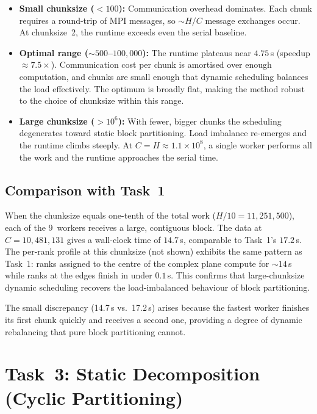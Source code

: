 \documentclass[11pt,a4paper]{article}
\begin{document}
\begin{itemize}\itemsep2pt
\item \textbf{Small chunksize ($< 100$):} Communication overhead
    dominates. Each chunk requires a round-trip of MPI messages, so
    $\sim H / C$ message exchanges occur. At chunksize~2, the runtime
    exceeds even the serial baseline.

\item \textbf{Optimal range ($\sim 500$--$100{,}000$):} The runtime
    plateaus near $4.75$\,s (speedup $\approx 7.5\times$).
    Communication cost per chunk is amortised over enough computation,
    and chunks are small enough that dynamic scheduling balances the load
    effectively. The optimum is broadly flat, making the method robust to
    the choice of chunksize within this range.

\item \textbf{Large chunksize ($> 10^6$):} With fewer, bigger chunks the
    scheduling degenerates toward static block partitioning. Load
    imbalance re-emerges and the runtime climbs steeply. At
    $C = H \approx 1.1 \times 10^8$, a single worker performs all the
    work and the runtime approaches the serial time.
\end{itemize}

\subsection{Comparison with Task~1}

When the chunksize equals one-tenth of the total work
($H/10 = 11{,}251{,}500$), each of the 9~workers receives a large,
contiguous block. The data at $C = 10{,}481{,}131$ gives a wall-clock time
of $14.7$\,s, comparable to Task~1's $17.2$\,s. The per-rank profile at
this chunksize (not shown) exhibits the same pattern as Task~1:
ranks assigned to the centre of the complex plane compute for
$\sim 14$\,s while ranks at the edges finish in under $0.1$\,s.
This confirms that large-chunksize dynamic scheduling recovers the
load-imbalanced behaviour of block partitioning.

The small discrepancy (14.7\,s vs.\ 17.2\,s) arises because the fastest
worker finishes its first chunk quickly and receives a second one,
providing a degree of dynamic rebalancing that pure block partitioning
cannot.


\section{Task~3: Static Decomposition (Cyclic Partitioning)}
\end{document}
